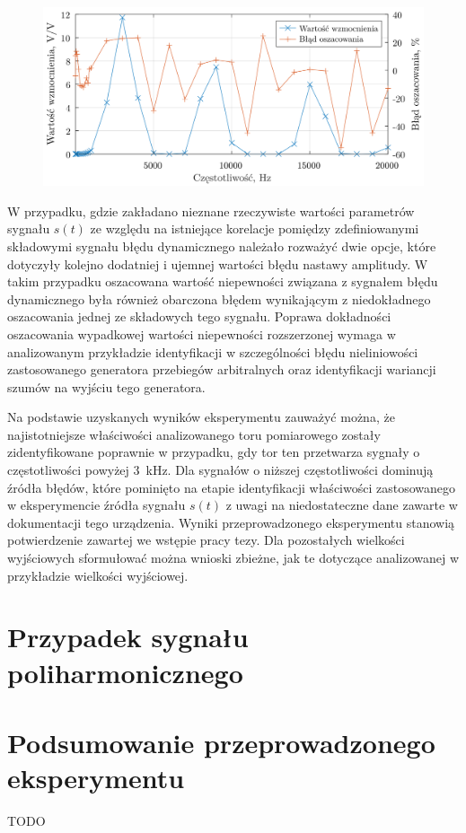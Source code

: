 \begin{figure}[htb!]
\begin{center}
\includegraphics{obrazki/mono_freqcomp}
\end{center}
\end{figure}

W przypadku, gdzie zakładano nieznane rzeczywiste wartości parametrów sygnału $s(t)$ ze względu na istniejące korelacje pomiędzy zdefiniowanymi składowymi sygnału błędu dynamicznego należało rozważyć dwie opcje, które dotyczyły kolejno dodatniej i ujemnej wartości błędu nastawy amplitudy. W takim przypadku oszacowana wartość niepewności związana z sygnałem błędu dynamicznego była również obarczona błędem wynikającym z niedokładnego oszacowania jednej ze składowych tego sygnału. Poprawa dokładności oszacowania wypadkowej wartości niepewności rozszerzonej wymaga w analizowanym przykładzie identyfikacji w szczególności błędu nieliniowości zastosowanego generatora przebiegów arbitralnych oraz identyfikacji wariancji szumów na wyjściu tego generatora.

Na podstawie uzyskanych wyników eksperymentu zauważyć można, że najistotniejsze właściwości analizowanego toru pomiarowego zostały zidentyfikowane poprawnie w przypadku, gdy tor ten przetwarza sygnały o częstotliwości powyżej \qty{3}{kHz}. Dla sygnałów o niższej częstotliwości dominują źródła błędów, które pominięto na etapie identyfikacji właściwości zastosowanego w eksperymencie źródła sygnału $s(t)$ z uwagi na niedostateczne dane zawarte w dokumentacji tego urządzenia. Wyniki przeprowadzonego eksperymentu stanowią potwierdzenie zawartej we wstępie pracy tezy. Dla pozostałych wielkości wyjściowych sformułować można wnioski zbieżne, jak te dotyczące analizowanej w przykładzie wielkości wyjściowej.

\section{Przypadek sygnału poliharmonicznego}

\section{Podsumowanie przeprowadzonego eksperymentu}

TODO 

